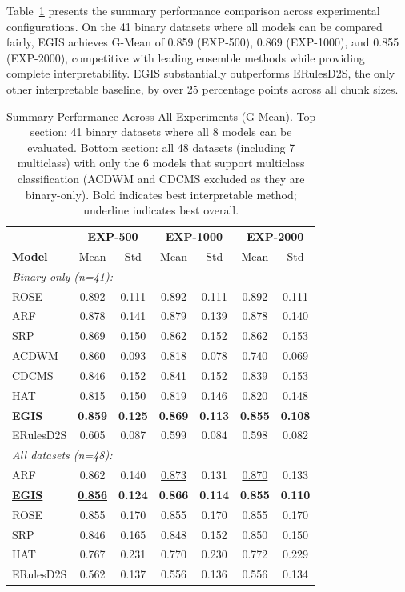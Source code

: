 \documentclass[lettersize,journal]{IEEEtran}
\begin{document}
Table~\ref{tab:summary_all} presents the summary performance comparison across experimental configurations. On the 41 binary datasets where all models can be compared fairly, EGIS achieves G-Mean of 0.859 (EXP-500), 0.869 (EXP-1000), and 0.855 (EXP-2000), competitive with leading ensemble methods while providing complete interpretability. EGIS substantially outperforms ERulesD2S, the only other interpretable baseline, by over 25 percentage points across all chunk sizes.

\begin{table}[htbp]
\centering
\caption{Summary Performance Across All Experiments (G-Mean). Top section: 41 binary datasets where all 8 models can be evaluated. Bottom section: all 48 datasets (including 7 multiclass) with only the 6 models that support multiclass classification (ACDWM and CDCMS excluded as they are binary-only). Bold indicates best interpretable method; underline indicates best overall.}
\label{tab:summary_all}
\scriptsize
\setlength{\tabcolsep}{3pt}
\begin{tabular}{lcccccc}
\toprule
& \multicolumn{2}{c}{\textbf{EXP-500}} & \multicolumn{2}{c}{\textbf{EXP-1000}} & \multicolumn{2}{c}{\textbf{EXP-2000}} \\
\textbf{Model} & Mean & Std & Mean & Std & Mean & Std \\
\midrule
\multicolumn{7}{l}{\textit{Binary only (n=41):}} \\
\underline{ROSE} & \underline{0.892} & 0.111 & \underline{0.892} & 0.111 & \underline{0.892} & 0.111 \\
ARF & 0.878 & 0.141 & 0.879 & 0.139 & 0.878 & 0.140 \\
SRP & 0.869 & 0.150 & 0.862 & 0.152 & 0.862 & 0.153 \\
ACDWM & 0.860 & 0.093 & 0.818 & 0.078 & 0.740 & 0.069 \\
CDCMS & 0.846 & 0.152 & 0.841 & 0.152 & 0.839 & 0.153 \\
HAT & 0.815 & 0.150 & 0.819 & 0.146 & 0.820 & 0.148 \\
\textbf{EGIS} & \textbf{0.859} & \textbf{0.125} & \textbf{0.869} & \textbf{0.113} & \textbf{0.855} & \textbf{0.108} \\
ERulesD2S & 0.605 & 0.087 & 0.599 & 0.084 & 0.598 & 0.082 \\
\midrule
\multicolumn{7}{l}{\textit{All datasets (n=48):}} \\
ARF & 0.862 & 0.140 & \underline{0.873} & 0.131 & \underline{0.870} & 0.133 \\
\underline{\textbf{EGIS}} & \underline{\textbf{0.856}} & \textbf{0.124} & \textbf{0.866} & \textbf{0.114} & \textbf{0.855} & \textbf{0.110} \\
ROSE & 0.855 & 0.170 & 0.855 & 0.170 & 0.855 & 0.170 \\
SRP & 0.846 & 0.165 & 0.848 & 0.152 & 0.850 & 0.150 \\
HAT & 0.767 & 0.231 & 0.770 & 0.230 & 0.772 & 0.229 \\
ERulesD2S & 0.562 & 0.137 & 0.556 & 0.136 & 0.556 & 0.134 \\
\bottomrule
\end{tabular}
\end{table}
\end{document}
